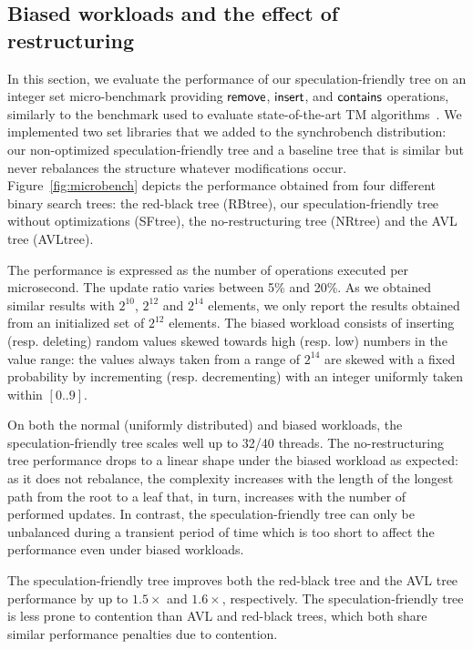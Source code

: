 \subsection{Biased workloads and the effect of restructuring}\label{ssec:microbench}

In this section, we evaluate the performance of our speculation-friendly tree on an integer set micro-benchmark providing $\act{remove}$, $\act{insert}$, and $\act{contains}$ operations, similarly to the benchmark used to evaluate state-of-the-art TM algorithms~\cite{FFR08,FGG09,DSS10}.
We implemented two set libraries that we added to the synchrobench distribution:
our non-optimized speculation-friendly tree and a baseline tree that is similar but never rebalances the structure whatever modifications occur.
Figure~\ref{fig:microbench} depicts the performance obtained from four different binary search trees: the red-black tree (RBtree), our speculation-friendly tree without optimizations (SFtree), the no-restructuring tree (NRtree) and the AVL tree (AVLtree). 

The performance is expressed as the number of operations executed per microsecond. The update ratio varies between 5\% and 20\%. As we obtained similar results with $2^{10}$, $2^{12}$ and $2^{14}$ elements, we only report the results obtained from an initialized set of $2^{12}$ elements.
The biased workload consists of inserting (resp. deleting) random values skewed towards high (resp. low) numbers in the value range: the values always taken from a range of $2^{14}$ are skewed with a fixed probability by incrementing (resp. decrementing) with an integer uniformly taken within $[0..9]$.

On both the normal (uniformly distributed) and biased workloads, the speculation-friendly tree scales 
well up to 32/40 threads. The no-restructuring tree performance drops to a linear shape 
under the biased workload as expected: as it does not rebalance, the complexity increases with the length of the longest path from the root to a leaf that, in turn, increases with the 
number of performed updates.
In contrast, the speculation-friendly tree can only be unbalanced during a transient period of time which is too short to affect the performance 
even under biased workloads. 

The speculation-friendly tree improves both the red-black tree and the AVL tree performance by up to $1.5\times$ and $1.6\times$, respectively. 
The speculation-friendly tree is less prone to contention than AVL and red-black trees, which both share similar performance penalties due to contention.


